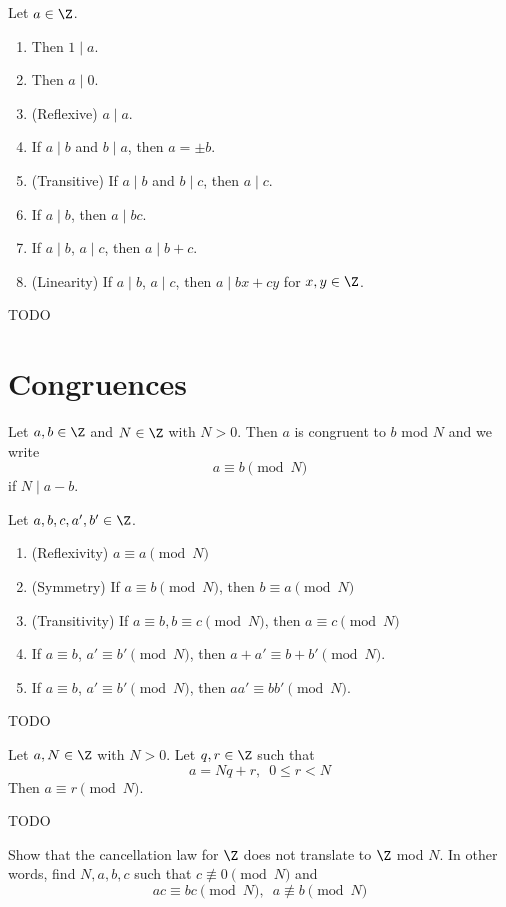 \begin{prop}
  Let $a \in \Z$.
  \begin{enumerate}[nosep,label=\textnormal{(\alph*)}]
  \item Then $1 \mid a$.
  \item Then $a \mid 0$.
  \item (Reflexive) $a \mid a$.
  \item If $a \mid b$ and $b \mid a$, then $a = \pm b$.  
  \item (Transitive) If $a \mid b$ and $b \mid c$, then $a \mid c$.
  \item If $a \mid b$, then $a \mid bc$.
  \item If $a \mid b$, $a \mid c$, then $a \mid b + c$.
  \item (Linearity)
    If $a \mid b$, $a \mid c$, then $a \mid bx + cy$ for $x,y \in \Z$.  
  \end{enumerate}
\end{prop}
\proof
TODO

\newpage
\section{Congruences}

\begin{defn}
  Let $a, b \in \Z$ and $N \in \Z$ with $N > 0$.
  Then $a$ is congruent to $b$ mod $N$ and we write
  \[
  a \equiv b \pmod{N}
  \]
  if $N \mid a - b$.
\end{defn}


\begin{prop}
  Let $a,b,c,a',b' \in \Z$.
  \begin{enumerate}[nosep,label=\textnormal{(\alph*)}]
  \item (Reflexivity) $a \equiv a \pmod{N}$
  \item (Symmetry) If $a \equiv b \pmod{N}$, then $b \equiv a \pmod{N}$
  \item (Transitivity)
    If $a \equiv b, b \equiv c \pmod{N}$, then
    $a \equiv c \pmod{N}$
  \item
    If
    $a \equiv b$,
    $a' \equiv b' \pmod{N}$,
    then
    $a + a' \equiv b + b' \pmod{N}$.
  \item
    If
    $a \equiv b$,
    $a' \equiv b' \pmod{N}$,
    then
    $a a' \equiv b b' \pmod{N}$.
  \end{enumerate}
\end{prop}
\proof
TODO

\begin{prop}
  Let $a, N \in \Z$ with $N > 0$.
  Let $q, r \in \Z$ such that
  \[
  a = Nq + r, \,\,\, 0 \leq r < N
  \]
  Then $a \equiv r \pmod{N}$.
\end{prop}
\proof
TODO

\begin{ex}
  Show that the cancellation law for $\Z$ does not translate to $\Z$ mod $N$.
  In other words, find $N, a, b, c$ such that $c \not\equiv 0 \pmod{N}$ and
  \[
  ac \equiv bc \pmod{N}, \,\,\, a \not\equiv b \pmod{N}
  \]
\end{ex}

\newpage
\newpage
